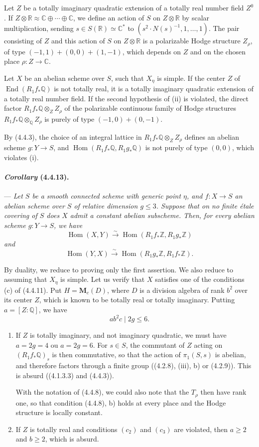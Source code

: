 \documentclass[10pt]{article}
\newcommand{\C}{\mathbb C}
\newcommand{\Q}{\mathbb Q}
\newcommand{\Z}{\mathbb Z}
\newcommand{\Hom}{\operatorname{Hom}}
\newcommand{\iso}{\xrightarrow{\sim}}
\newcommand{\R}{\mathbb R}
\providecommand{\End}{\operatorname{End}}
\begin{document}
Let $Z$ be a totally imaginary quadratic extension of a totally real number field $Z^0$. If $Z\otimes\R\approx \C\oplus\cdots\oplus\C$, we define an action of $S$ on $Z\otimes\R$ by scalar multiplication, sending $s\in S(\R)\simeq\C^*$ to $(s^2\cdot N(s)^{-1},1,\ldots,1)$. The pair consisting of $Z$ and this action of $S$ on $Z\otimes\R$ is a polarizable Hodge structure $Z_\rho$, of type $(-1,1)+(0,0)+(1,-1)$, which depends on $Z$ and on the chosen place $\rho:Z\to\C$.

Let $X$ be an abelian scheme over $S$, such that $X_\eta$ is simple. If the center $Z$ of $\End(R_1f_*\Q)$ is not totally real, it is a totally imaginary quadratic extension of a totally real number field. If the second hypothesis of (ii) is violated, the direct factor $R_1f_*\Q\otimes_Z Z_\rho$ of the polarizable continuous family of Hodge structures $R_1f_*\Q\otimes_\Q Z_\rho$ is purely of type $(-1,0)+(0,-1)$.

By (4.4.3), the choice of an integral lattice in $R_1f_*\Q\otimes_Z Z_\rho$ defines an abelian scheme $g:Y\to S$, and $\Hom(R_1f_*\Q,R_1g_*\Q)$ is not purely of type $(0,0)$, which violates (i).

\paragraph{\emph{Corollary} (4.4.13).} --- {\itshape Let $S$ be a smooth connected scheme with generic point $\eta$, and $f:X\to S$ an abelian scheme over $S$ of relative dimension $g\le3$. Suppose that on no finite étale covering of $S$ does $X$ admit a constant abelian subscheme. Then, for every abelian scheme $g:Y\to S$, we have
\[
\Hom(X,Y)\iso \Hom(R_1f_*\Z,R_1g_*\Z)
\]
and
\[
\Hom(Y,X)\iso \Hom(R_1g_*\Z,R_1f_*\Z).
\]}

By duality, we reduce to proving only the first assertion. We also reduce to assuming that $X_\eta$ is simple. Let us verify that $X$ satisfies one of the conditions (c) of (4.4.11). Put $H=\mathbf{M}_c(D)$, where $D$ is a division algebra of rank $b^2$ over its center $Z$, which is known to be totally real or totally imaginary. Putting $a=[Z:\Q]$, we have
\[
\tag{4.4.13.1}
ab^2c\mid 2g\le6.
\]


\begin{enumerate}[label=\arabic*)]
\item If $Z$ is totally imaginary, and not imaginary quadratic, we must have $a=2g=4$ ou $a=2g=6$.  For $s\in S$, the commutant of $Z$ acting on $(R_1f_*\Q)_s$ is then commutative, so that the action of $\pi_1(S,s)$ is abelian, and therefore factors through a finite group ((4.2.8), (iii), b) or (4.2.9)). This is absurd ((4.1.3.3) and (4.4.3)).

With the notation of (4.4.8), we could also note that the $T_\rho$ then have rank one, so that condition (4.4.8), b) holds at every place and the Hodge structure is locally constant.

\item If $Z$ is totally real and conditions $(c_2)$ and $(c_3)$ are violated, then $a\ge2$ and $b\ge2$, which is absurd.
\end{enumerate}
\end{document}
